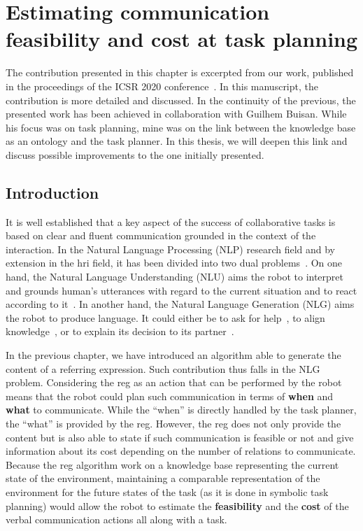 \ifdefined{}
\else
\setcounter{chapter}{5} %
\dominitoc
\faketableofcontents
\fi

\chapter{Estimating communication feasibility and cost at task planning}
\label{chap:5}
\minitoc

The contribution presented in this chapter is excerpted from our work, published in the proceedings of the ICSR 2020 conference~\cite{buisan_2020_human}. In this manuscript, the contribution is more detailed and discussed. In the continuity of the previous, the presented work has been achieved in collaboration with Guilhem Buisan. While his focus was on task planning, mine was on the link between the knowledge base as an ontology and the task planner. In this thesis, we will deepen this link and discuss possible improvements to the one initially presented.

\section{Introduction}

It is well established that a key aspect of the success of collaborative tasks is based on clear and fluent communication grounded in the context of the interaction. In the Natural Language Processing (NLP) research field and by extension in the \acrfull{hri} field, it has been divided into two dual problems~\cite{tellex_2020_robots}. On one hand, the Natural Language Understanding (NLU) aims the robot to interpret and grounds human's utterances with regard to the current situation and to react according to it~\cite{brawer_2018_situated}. In another hand, the Natural Language Generation (NLG) aims the robot to produce language. It could either be to ask for help~\cite{tellex_2014_asking}, to align knowledge~\cite{devin_2016_implemented}, or to explain its decision to its partner~\cite{roncone_2017_transparent}.

In the previous chapter, we have introduced an algorithm able to generate the content of a referring expression. Such contribution thus falls in the NLG problem. Considering the \acrshort{reg} as an action that can be performed by the robot means that the robot could plan such communication in terms of \textbf{when} and \textbf{what} to communicate. While the ``when'' is directly handled by the task planner, the ``what'' is provided by the \acrshort{reg}. However, the \acrshort{reg} does not only provide the content but is also able to state if such communication is feasible or not and give information about its cost depending on the number of relations to communicate. Because the \acrshort{reg} algorithm work on a knowledge base representing the current state of the environment, maintaining a comparable representation of the environment for the future states of the task (as it is done in symbolic task planning) would allow the robot to estimate the \textbf{feasibility} and the \textbf{cost} of the verbal communication actions all along with a task.

